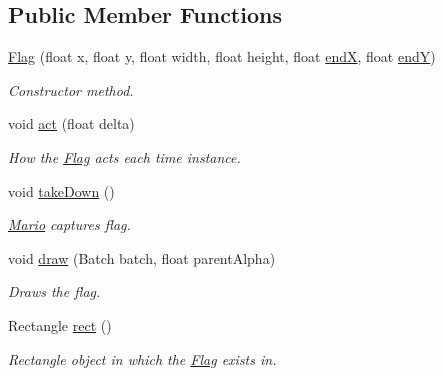 \subsection*{Public Member Functions}
\begin{DoxyCompactItemize}
\item 
\hyperlink{classnl_1_1arjanfrans_1_1mario_1_1model_1_1Flag_a69dcd8fbda6358ef4d2f0afbc273ef19}{Flag} (float x, float y, float width, float height, float \hyperlink{classnl_1_1arjanfrans_1_1mario_1_1model_1_1Flag_a3bbb2687c3bac27f6cee8ae891eddc16}{endX}, float \hyperlink{classnl_1_1arjanfrans_1_1mario_1_1model_1_1Flag_af5798cd4d07551f52e4b06e1b42efc19}{endY})
\begin{DoxyCompactList}\small\item\em Constructor method. \end{DoxyCompactList}\item 
void \hyperlink{classnl_1_1arjanfrans_1_1mario_1_1model_1_1Flag_a92c1d0b95a46934e2f9b286ca233452a}{act} (float delta)
\begin{DoxyCompactList}\small\item\em How the \hyperlink{classnl_1_1arjanfrans_1_1mario_1_1model_1_1Flag}{Flag} acts each time instance. \end{DoxyCompactList}\item 
void \hyperlink{classnl_1_1arjanfrans_1_1mario_1_1model_1_1Flag_accca18a710db846a8479e60be7fcc847}{take\+Down} ()
\begin{DoxyCompactList}\small\item\em \hyperlink{classnl_1_1arjanfrans_1_1mario_1_1model_1_1Mario}{Mario} captures flag. \end{DoxyCompactList}\item 
void \hyperlink{classnl_1_1arjanfrans_1_1mario_1_1model_1_1Flag_a37b444b2cce56fc741f29b12cfb9ebd0}{draw} (Batch batch, float parent\+Alpha)
\begin{DoxyCompactList}\small\item\em Draws the flag. \end{DoxyCompactList}\item 
Rectangle \hyperlink{classnl_1_1arjanfrans_1_1mario_1_1model_1_1Flag_a1602244ce7c750bd95ac7265e50ad557}{rect} ()
\begin{DoxyCompactList}\small\item\em Rectangle object in which the \hyperlink{classnl_1_1arjanfrans_1_1mario_1_1model_1_1Flag}{Flag} exists in. \end{DoxyCompactList}\item 

\end{DoxyCompactItemize}
